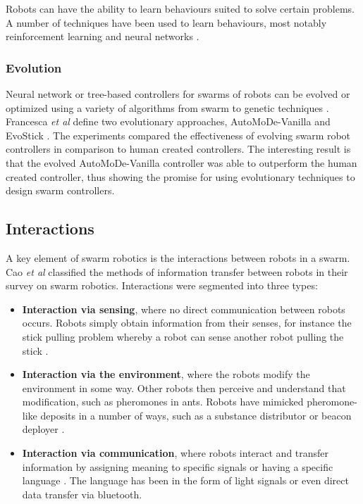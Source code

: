 Robots can have the ability to learn behaviours suited to solve certain problems. A number of techniques have been used to learn behaviours, most notably reinforcement learning and neural networks \cite{samejima1999adaptive, sun1999multi}.

\subsubsection{Evolution}
Neural network or tree-based controllers for swarms of robots can be evolved or optimized using a variety of algorithms from swarm to genetic techniques \cite{baldassarre2003evolving, tuci2014evolutionary}. Francesca \textit{et al} define two evolutionary approaches, AutoMoDe-Vanilla and EvoStick \cite{francesca2014automode,francesca2014experiment}. The experiments compared the effectiveness of evolving swarm robot controllers in comparison to human created controllers. The interesting result is that the evolved AutoMoDe-Vanilla controller was able to outperform the human created controller, thus showing the promise for using evolutionary techniques to design swarm controllers.

\subsection{Interactions}
A key element of swarm robotics is the interactions between robots in a swarm. Cao \textit{et al} \cite{cao1997cooperative} classified the methods of information transfer between robots in their  survey on swarm robotics. Interactions were segmented into three types:
\begin{itemize}
	\item \textbf{Interaction via sensing}, where no direct communication between robots occurs. Robots simply obtain information from their senses, for instance the stick pulling problem whereby a robot can sense another robot pulling the stick \cite{ijspeert2001collaboration}. 
	\item \textbf{Interaction via the environment}, where the robots modify the environment in some way. Other robots then perceive and understand that modification, such as pheromones in ants. Robots have mimicked pheromone-like deposits in a number of ways, such as a substance distributor \cite{fujisawa2014designing} or beacon deployer \cite{barth2003dynamic}.
	\item \textbf{Interaction via communication}, where robots interact and transfer information by assigning meaning to specific signals or having a specific language \cite{hoff2010two}. The language has been in the form of light signals or even direct data transfer via bluetooth.  
\end{itemize}

